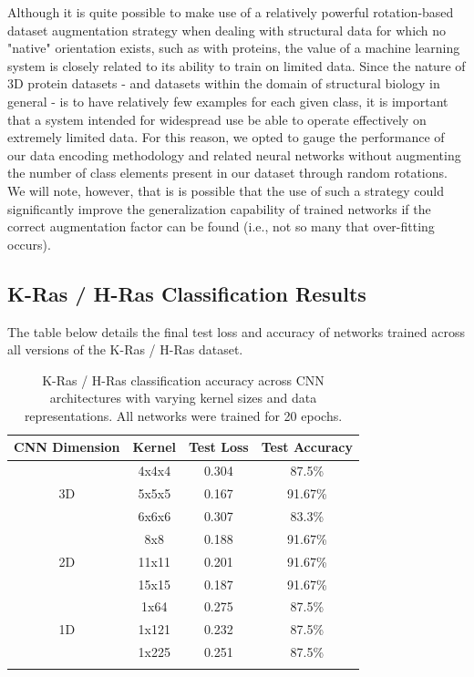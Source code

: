 \documentclass{article}
\begin{document}
Although it is quite possible to make use of a relatively powerful rotation-based dataset augmentation strategy when dealing with structural data for which no "native" orientation exists, such as with proteins, the value of a machine learning system is closely related to its ability to train on limited data. Since the nature of 3D protein datasets - and datasets within the domain of structural biology in general - is to have relatively few examples for each given class, it is important that a system intended for widespread use be able to operate effectively on extremely limited data. For this reason, we opted to gauge the performance of our data encoding methodology and related neural networks without augmenting the number of class elements present in our dataset through random rotations. We will note, however, that is is possible that the use of such a strategy could significantly improve the generalization capability of trained networks if the correct augmentation factor can be found (i.e., not so many that over-fitting occurs).

\subsection{K-Ras / H-Ras Classification Results}

The table below details the final test loss and accuracy of networks trained across all versions of the K-Ras / H-Ras dataset.

\begin{table}[H]
\centering
\begin{tabular}[t]{cccc}
\toprule
CNN Dimension & Kernel & Test Loss & Test Accuracy\\
\midrule
 & 4x4x4 & 0.304 & 87.5\% \\

3D & 5x5x5 & 0.167 & 91.67\% \\

 & 6x6x6 & 0.307 & 83.3\% \\
\midrule
 & 8x8 & 0.188 & 91.67\% \\

2D & 11x11 & 0.201 & 91.67\% \\

 & 15x15 & 0.187 & 91.67\% \\
\midrule
 & 1x64 & 0.275 & 87.5\% \\

1D & 1x121 & 0.232 & 87.5\% \\

 & 1x225 & 0.251 & 87.5\% \\
\bottomrule \\
\end{tabular}
\caption{K-Ras / H-Ras classification accuracy across CNN architectures with varying kernel sizes and data representations. All networks were trained for 20 epochs.}
\label{table:4}
\end{table}
\end{document}
